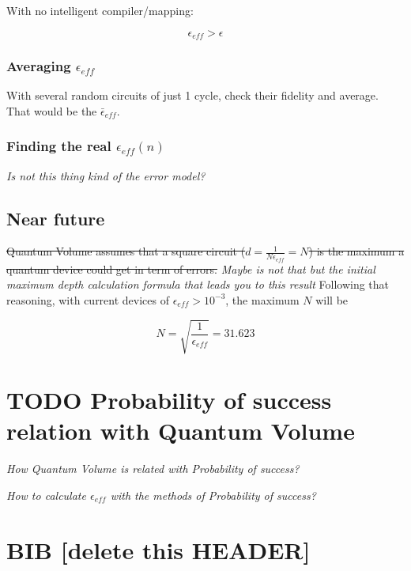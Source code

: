 \documentclass[11pt]{article}
\begin{document}
With no intelligent compiler/mapping:

$$\epsilon_{eff} > \epsilon$$

\subsubsection{Averaging \(\epsilon_{eff}\)}
\label{sec:org6cf5900}

With several random circuits of just 1 cycle, check their fidelity and average. That would be the \(\bar{\epsilon}_{eff}\).

\subsubsection{Finding the real \(\epsilon_{eff} (n)\)}
\label{sec:org8bdd8ae}

\emph{Is not this thing kind of the error model?}

\subsection{Near future}
\label{sec:orgf64a6a0}

\sout{Quantum Volume assumes that a square circuit (\(d = \frac{1}{N \epsilon_{eff}} = N\)) is the maximum a quantum device could get in term of errors.}
\emph{Maybe is not that but the initial maximum depth calculation formula that leads you to this result}
Following that reasoning, with current devices of \(\epsilon_{eff} > 10^{-3}\), the maximum \(N\) will be

$$N = \sqrt{\frac{1}{\epsilon_{eff}}} = 31.623$$


\section{{\bfseries\sffamily TODO} Probability of success relation with Quantum Volume}
\label{sec:org86f6f3a}

\emph{How Quantum Volume is related with Probability of success?}

\emph{How to calculate \(\epsilon_{eff}\) with the methods of Probability of success?}



\section{BIB [delete this HEADER]}
\label{sec:org5309cf5}



\end{document}
